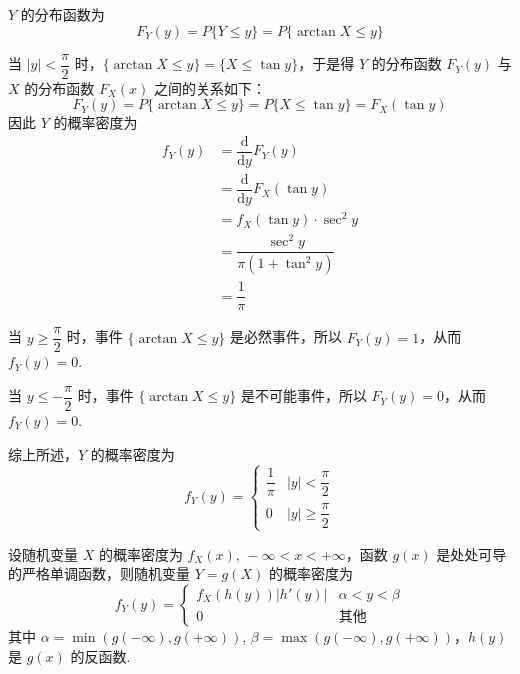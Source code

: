 \begin{solution}
    $Y$ 的分布函数为
    $$
    F_{Y}(y) = P\{Y \leqslant y\} = P\{\arctan X \leqslant y\}
    $$

    当 $|y|<\dfrac{\pi}{2}$ 时，$\{\arctan X \leqslant y\}=\{X \leqslant \tan y\}$，于是得 $Y$ 的分布函数 $F_{Y}(y)$ 与 $X$ 的分布函数 $F_{X}(x)$ 之间的关系如下：
    $$
    F_{Y}(y) = P\{\arctan X \leqslant y\} = P\{X \leqslant \tan y\} = F_{X}(\tan y)
    $$
    因此 $Y$ 的概率密度为
    $$
    \begin{aligned}
        f_{Y}(y) &= \dfrac{\text{d}}{\text{d}y} F_{Y}(y) \\
        &= \dfrac{\text{d}}{\text{d}y} F_{X}(\tan y) \\
        &= f_{X}(\tan y) \cdot \sec^2 y \\
        &= \dfrac{\sec^2 y}{\pi (1+\tan^2 y)} \\
        &= \dfrac{1}{\pi}
    \end{aligned}
    $$

    当 $y \geqslant \dfrac{\pi}{2}$ 时，事件 $\{\arctan X \leqslant y\}$ 是必然事件，所以 $F_{Y}(y)=1$，从而 $f_{Y}(y)=0$.
    \vspace{0.5em}

    当 $y \leqslant -\dfrac{\pi}{2}$ 时，事件 $\{\arctan X \leqslant y\}$ 是不可能事件，所以 $F_{Y}(y)=0$，从而 $f_{Y}(y)=0$. \vspace{0.5em}

    综上所述，$Y$ 的概率密度为
    $$
    f_{Y}(y)=\begin{cases}
        \dfrac{1}{\pi} & |y| < \dfrac{\pi}{2} \\[0.5em]
        0 & |y| \geqslant \dfrac{\pi}{2}
    \end{cases}
    $$
\end{solution}

\begin{theorem} \label{theorem:f(y)}
    设随机变量 $X$ 的概率密度为 $f_{X}(x), \, -\infty < x < +\infty$，函数 $g(x)$ 是处处可导的严格单调函数，则随机变量 $Y=g(X)$ 的概率密度为
    $$
    f_{Y}(y)=\begin{cases}
        f_{X}(h(y))|h'(y)| & \alpha < y < \beta \\[-0.6em]
        0 & \text{其他}
    \end{cases}
    $$
    其中 $\alpha = \min(g(-\infty),g(+\infty)), \, \beta = \max(g(-\infty),g(+\infty))$，$h(y)$ 是 $g(x)$ 的反函数.
\end{theorem}

